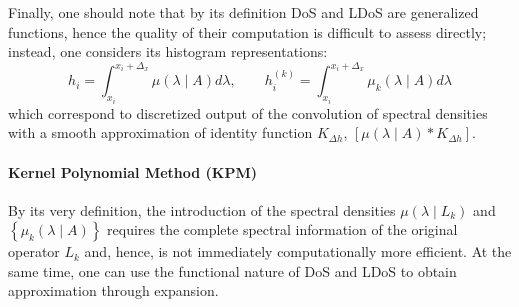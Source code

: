 Finally, one should note that by its definition DoS and LDoS  are generalized functions, hence the quality of their computation is difficult to assess directly; instead, one considers its histogram representations:
\begin{equation}
    h_i = \int_{x_i}^{x_i+\Delta_x} \mu( \lambda \mid A ) d\lambda, \qquad h^{(k)}_i = \int_{x_i}^{x_i+\Delta_x} \mu_k( \lambda \mid A ) d\lambda 
\end{equation}
which correspond to discretized output of the convolution of spectral densities with a smooth approximation of identity function \( K_{\Delta h} \), \( \left[ \mu(\lambda \mid A ) * K_{\Delta h }  \right]\).

\paragraph{ Kernel Polynomial Method (KPM) }
%
%

By its very definition, the introduction of the spectral densities \( \mu(\lambda \mid L_k ) \) and \( \left\{ \mu_k(\lambda \mid A ) \right\}\) requires the complete spectral information of the original operator \( L_k \) and, hence, is not immediately computationally more efficient. At the same time, one can use the functional nature of DoS and LDoS to obtain approximation through expansion.

